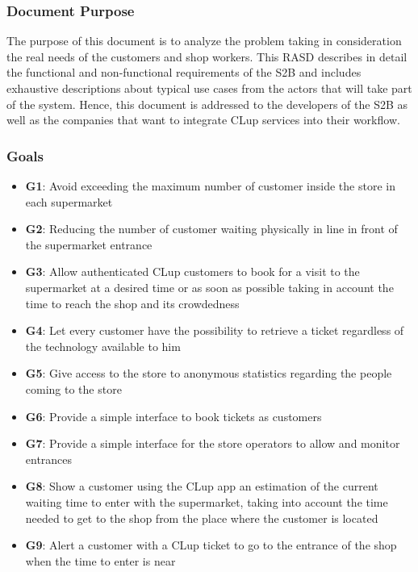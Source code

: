\subsubsection{Document Purpose}

The purpose of this document is to analyze the problem taking in consideration the real needs of the customers and shop workers.
This RASD describes in detail the functional and non-functional requirements of the S2B and includes exhaustive descriptions about typical use cases from the actors that will take part of the system.
Hence, this document is addressed to the developers of the S2B as well as the companies that want to integrate CLup services into their workflow.

\vfill

\pagebreak

\subsubsection{Goals}
\begin{itemize}

      \item \textbf{G1}: Avoid exceeding the maximum number of customer inside the store in each supermarket

      \item \textbf{G2}: Reducing the number of customer waiting physically in line in front of the supermarket entrance

      \item \textbf{G3}: Allow authenticated CLup customers to book for a visit to the supermarket at a desired time or as soon as possible taking in account the time to reach the shop and its crowdedness

      \item \textbf{G4}: Let every customer have the possibility to retrieve a ticket regardless of the technology available to him

      \item \textbf{G5}: Give access to the store to anonymous statistics regarding the people coming to the store

      \item \textbf{G6}: Provide a simple interface to book tickets as customers

      \item \textbf{G7}: Provide a simple interface for the store operators to allow and monitor entrances

      \item \textbf{G8}: Show a customer using the CLup app an estimation of the current waiting time to enter with the supermarket, taking into account the time needed to get to the shop from the place where the customer is located

      \item \textbf{G9}: Alert a customer with a CLup ticket to go to the entrance of the shop when the time to enter is near
\end{itemize}
